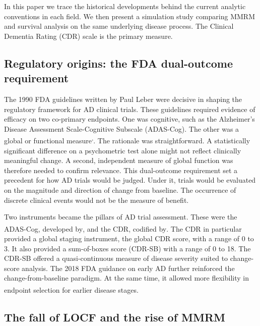 \documentclass[
  11pt,
]{article}
\begin{document}
In this paper we trace the historical developments behind
the current analytic conventions in each field. We then
present a simulation study comparing MMRM and survival
analysis on the same underlying disease process. The
Clinical Dementia Rating (CDR) scale is the primary
measure.

\subsection{Regulatory origins: the FDA dual-outcome requirement}\label{regulatory-origins-the-fda-dual-outcome-requirement}

The 1990 FDA guidelines written by Paul Leber were
decisive in shaping the regulatory framework for AD
clinical trials. These guidelines required evidence of
efficacy on two co-primary endpoints. One was cognitive,
such as the Alzheimer's Disease Assessment Scale-Cognitive
Subscale (ADAS-Cog). The other was a global or functional
measure\textsuperscript{,}. The
rationale was straightforward. A statistically significant
difference on a psychometric test alone might not reflect
clinically meaningful change. A second, independent
measure of global function was therefore needed to confirm
relevance. This dual-outcome requirement set a precedent
for how AD trials would be judged. Under it, trials would
be evaluated on the magnitude and direction of change from
baseline. The occurrence of discrete clinical events would
not be the measure of benefit.

Two instruments became the pillars of AD trial assessment.
These were the ADAS-Cog, developed by\textsuperscript{}, and
the CDR, codified by\textsuperscript{}. The CDR in particular
provided a global staging instrument, the global CDR
score, with a range of 0 to 3. It also provided a
sum-of-boxes score (CDR-SB) with a range of 0 to 18. The
CDR-SB offered a quasi-continuous measure of disease
severity suited to change-score analysis. The 2018 FDA
guidance on early AD further reinforced the
change-from-baseline paradigm. At the same time, it
allowed more flexibility in endpoint selection for earlier
disease stages\textsuperscript{}.

\subsection{The fall of LOCF and the rise of MMRM}\label{the-fall-of-locf-and-the-rise-of-mmrm}
\end{document}
